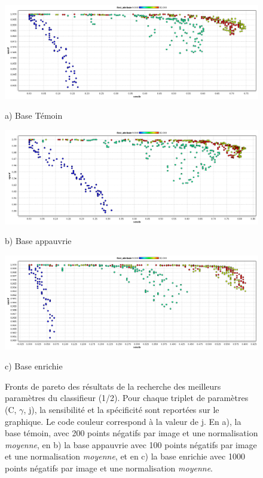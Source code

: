 \begin{figure}[h!]
\label{fig:paretoParams1}
\begin{center}
 \includegraphics[width=14cm]{images/pareto_param_200.png}

{\small a) Base Témoin}
\vspace{0.5cm}

\includegraphics[width=14cm]{images/pareto_param_100.png}

{\small b) Base appauvrie}


 \includegraphics[width=14cm]{images/pareto_param_1000.png}
 
{\small c) Base enrichie}



\end{center}
 \caption{Fronts de pareto des résultats de la recherche des meilleurs paramètres du classifieur (1/2). Pour chaque triplet de paramètres (C, $\gamma$, j), la sensibilité et la spécificité sont reportées sur le graphique. Le code couleur correspond à la valeur de j. En a), la base témoin, avec 200 points négatifs par image et une normalisation \emph{moyenne}, en b) la base appauvrie avec 100 points négatifs par image et une normalisation \emph{moyenne}, et en c) la base enrichie avec 1000 points négatifs par image et une normalisation \emph{moyenne}.}
\end{figure}



